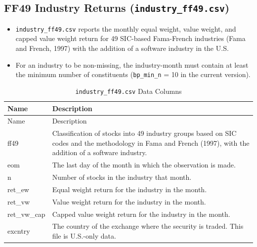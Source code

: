 \documentclass[12pt,title,fleqn]{article}
\begin{document}
\subsection{FF49 Industry Returns (\texttt{industry\_ff49.csv})}
\begin{itemize}
    \item \texttt{industry\_ff49.csv} reports the monthly equal weight, value weight, and capped value weight return for 49 SIC-based Fama-French industries (Fama and French, 1997) with the addition of a software industry in the U.S.
    \item For an industry to be non-missing, the industry-month must contain at least the minimum number of constituents (\texttt{bp\_min\_n} = 10 in the current version).

\end{itemize}

{\scriptsize
	\begin{longtable}{@{\extracolsep{\fill}}|l|m{14.2cm}|@{}}
	\caption{\texttt{industry\_ff49.csv} Data Columns \label{industry_ff49}}\\
	
	\hline
	Name & Description \\
	\hline
	\endfirsthead
	
	\hline
	Name & Description \\
	\hline
	\endhead
	
	\hline
	\endfoot
	
	
	\hline\hline
	\endlastfoot
	
	ff49\rule{0pt}{10pt} & Classification of stocks into 49 industry groups based on SIC codes and the methodology in Fama and French (1997), with the addition of a software industry. \\[1ex]
	
	eom & The last day of the month in which the observation is made. \\[1ex]

	n & Number of stocks in the industry that month. \\[1ex]

	ret\_ew & Equal weight return for the industry in the month.\\[1ex]

	ret\_vw & Value weight return for the industry in the month.\\[1ex]

	ret\_vw\_cap & Capped value weight return for the industry in the month.\\[1ex]

	excntry & The country of the exchange where the security is traded. This file is U.S.-only data. \\[1ex]

\end{longtable}}
\end{document}
